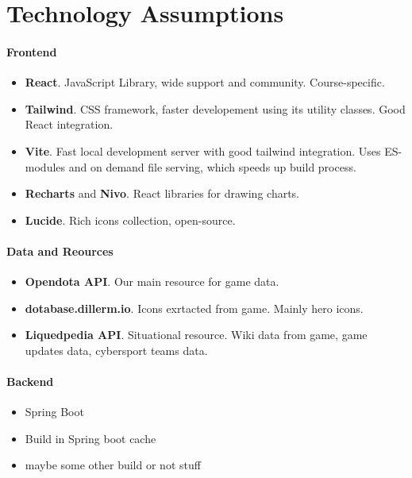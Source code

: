 \section{Technology Assumptions}

 \paragraph{Frontend}
\begin{itemize}

    \item \textbf{React}. JavaScript Library, wide support and community. Course-specific.
    \item \textbf{Tailwind}. CSS framework, faster developement using its utility classes. Good React integration.
    \item \textbf{Vite}. Fast local development server with good tailwind integration.
    Uses ES-modules and on demand file serving, which speeds up build process.

    \item \textbf{Recharts} and \textbf{Nivo}. React libraries for drawing charts.
    \item \textbf{Lucide}. Rich icons collection, open-source.

\end{itemize}

\paragraph{Data and Reources}

\begin{itemize}

    \item \textbf{Opendota API}. Our main resource for game data.
    \item \textbf{dotabase.dillerm.io}. Icons exrtacted from game. Mainly hero icons.
    \item \textbf{Liquedpedia API}. Situational resource. Wiki data from game, game updates data, cybersport teams data.

\end{itemize}

\paragraph{Backend}

\begin{itemize}

    \item Spring Boot
    \item Build in Spring boot cache
    \item maybe some other build or not stuff

\end{itemize}